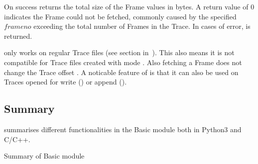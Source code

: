 On success  returns the total size of the Frame values in bytes. A return value of $0$ indicates the Frame could not be fetched, commonly caused by the specified $frameno$ exceeding the total number of Frames in the Trace. In cases of error,  is returned.

 only works on regular Trace files (see  section in~\cite{UnixFileTypes}). This also means it is not compatible for Trace files created with mode . Also fetching a Frame does not change the Trace offset .  A noticable feature of  is that it can also be used on Traces opened for write () or append ().


\subsection{Summary}
 summarises different functionalities in the Basic module both in Python3 and C/C++.

\begin{table}
	\centering
	
	\caption{Summary of Basic module\label{tbl:BasicSummary}}
\end{table}
